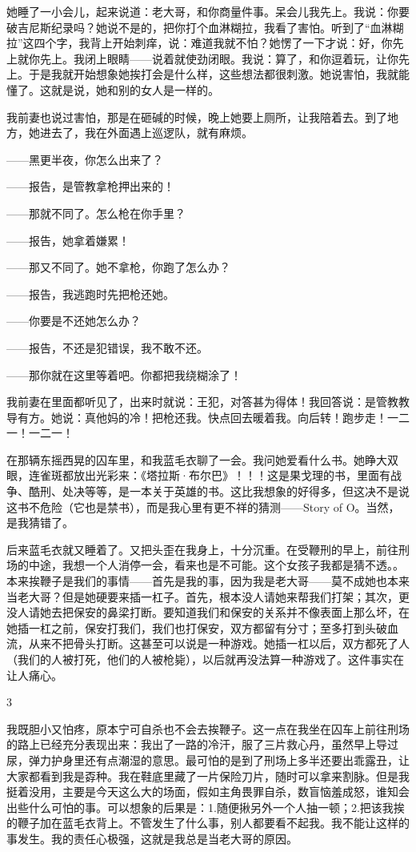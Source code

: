 她睡了一小会儿，起来说道：老大哥，和你商量件事。呆会儿我先上。我说：你要破吉尼斯纪录吗？她说不是的，把你打个血淋糊拉，我看了害怕。听到了“血淋糊拉”这四个字，我背上开始刺痒，说：难道我就不怕？她愣了一下才说：好，你先上就你先上。我闭上眼睛——说着就使劲闭眼。我说：算了，和你逗着玩，让你先上。于是我就开始想象她挨打会是什么样，这些想法都很刺激。她说害怕，我就能懂了。这就是说，她和别的女人是一样的。 

我前妻也说过害怕，那是在砸碱的时候，晚上她要上厕所，让我陪着去。到了地方，她进去了，我在外面遇上巡逻队，就有麻烦。 

——黑更半夜，你怎么出来了？ 

——报告，是管教拿枪押出来的！ 

——那就不同了。怎么枪在你手里？ 

——报告，她拿着嫌累！ 

——那又不同了。她不拿枪，你跑了怎么办？ 

——报告，我逃跑时先把枪还她。 

——你要是不还她怎么办？ 

——报告，不还是犯错误，我不敢不还。 

——那你就在这里等着吧。你都把我绕糊涂了！ 

我前妻在里面都听见了，出来时就说：王犯，对答甚为得体！我回答说：是管教教导有方。她说：真他妈的冷！把枪还我。快点回去暖着我。向后转！跑步走！一二一！一二一！ 



在那辆东摇西晃的囚车里，和我蓝毛衣聊了一会。我问她爱看什么书。她睁大双眼，连雀斑都放出光彩来：《塔拉斯·布尔巴》！！！这是果戈理的书，里面有战争、酷刑、处决等等，是一本关于英雄的书。这比我想象的好得多，但这决不是说这书不危险（它也是禁书），而是我心里有更不祥的猜测——Story of O。当然，是我猜错了。 

后来蓝毛衣就又睡着了。又把头歪在我身上，十分沉重。在受鞭刑的早上，前往刑场的中途，我想一个人消停一会，看来也是不可能。这个女孩子我都是猜不透。。本来挨鞭子是我们的事情——首先是我的事，因为我是老大哥——莫不成她也本来当老大哥？但是她硬要来插一杠子。首先，根本没人请她来帮我们打架；其次，更没人请她去把保安的鼻梁打断。要知道我们和保安的关系并不像表面上那么坏，在她插一杠之前，保安打我们，我们也打保安，双方都留有分寸；至多打到头破血流，从来不把骨头打断。这甚至可以说是一种游戏。她插一杠以后，双方都死了人（我们的人被打死，他们的人被枪毙），以后就再没法算一种游戏了。这件事实在让人痛心。 



3 

我既胆小又怕疼，原本宁可自杀也不会去挨鞭子。这一点在我坐在囚车上前往刑场的路上已经充分表现出来：我出了一路的冷汗，服了三片救心丹，虽然早上导过尿，弹力护身里还有点潮湿的意思。最可怕的是到了刑场上多半还要出乖露丑，让大家都看到我是孬种。我在鞋底里藏了一片保险刀片，随时可以拿来割脉。但是我挺着没用，主要是今天这么大的场面，假如主角畏罪自杀，数盲恼羞成怒，谁知会出些什么可怕的事。可以想象的后果是：1.随便揪另外一个人抽一顿；2.把该我挨的鞭子加在蓝毛衣背上。不管发生了什么事，别人都要看不起我。我不能让这样的事发生。我的责任心极强，这就是我总是当老大哥的原因。 

